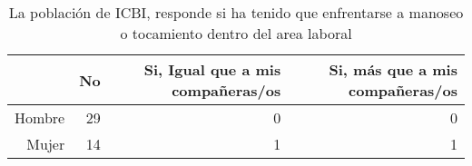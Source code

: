 \begin{table}[ht]
\centering
\begin{tabular}{rrrr}
  \hline
 & No & Si, Igual que a mis compañeras/os & Si, más que a mis compañeras/os \\ 
  \hline
Hombre &  29 &   0 &   0 \\ 
  Mujer &  14 &   1 &   1 \\ 
   \hline
\end{tabular}
\caption{La población de ICBI, responde si ha tenido que
             enfrentarse a manoseo o tocamiento dentro del area laboral} 
\label{icbi_tabla}
\end{table}
